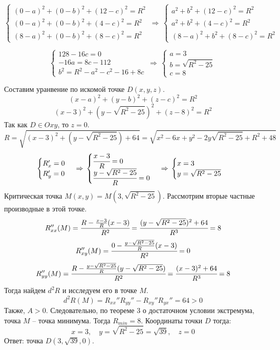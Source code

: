 \documentclass[12pt]{report}
\begin{document}
$$ \begin{cases} (0-a)^2+(0-b)^2+(12-c)^2=R^2 \\
                (0-a)^2+(0-b)^2+(4-c)^2=R^2 \\
                (8-a)^2+(0-b)^2+(8-c)^2=R^2
    \end{cases} \,\Rightarrow\,
    \begin{cases} a^2+b^2+(12-c)^2=R^2 \\
                    a^2+b^2+(4-c)^2=R^2 \\
                    (8-a)^2+b^2+(8-c)^2=R^2
    \end{cases}$$

$$ \begin{cases} 128-16c=0 \\
                -16a=8c-112 \\
                b^2=R^2-a^2-c^2-16+8c
    \end{cases} \,\Rightarrow\,
    \begin{cases} a=3 \\
                b=\sqrt{R^2-25} \\
                c=8
    \end{cases}$$
    
Составим уранвение по искомой точке $D(x,y,z)$.
$$ (x-a)^2+(y-b)^2+(z-c)^2=R^2 $$
$$ (x-3)^2+(y-\sqrt{R^2-25})^2+(z-8)^2=R^2 $$
Так как $D\in Oxy$, то $z=0$.
$$ R=\sqrt{(x-3)^2+(y-\sqrt{R^2-25})+64}=\sqrt{x^2-6x+y^2-2y\sqrt{R^2-25}+R^2+48} $$
$$ \begin{cases} R_x'=0 \\
                R_y'=0
    \end{cases} \,\Rightarrow\,
    \begin{cases} \cfrac{x-3}{R}=0 \\
                \cfrac{y-\sqrt{R^2-25}}{R}=0
    \end{cases} \,\Rightarrow\,
    \begin{cases} x=3 \\
                y=\sqrt{R^2-25}
    \end{cases}$$
Критическая точка $M(x,y)=M(3,\sqrt{R^2-25})$. Рассмотрим вторые частные производные в этой точке.
$$ R_{xx}''(M)=\cfrac{R-\frac{x-3}{R}(x-3)}{R^2}=\cfrac{(y-\sqrt{R^2-25})^2+64}{R^3}=8 $$
$$ R_{xy}''(M)=\cfrac{0-\frac{y-\sqrt{R^2-25}}{R}(x-3)}{R^2}=0 $$
$$ R_{yy}''(M)=\cfrac{R-\frac{y-\sqrt{R^2-25}}{R}(y-\sqrt{R^2-25})}{R^2}=\cfrac{(x-3)^2+64}{R^3}=8 $$
Тогда найдем $d^2R$  и исследуем его в точке $M$.
$$ d^2R(M)=R_{xx}''R_{yy}''-R_{xy}''R_{yx}''=64>0 $$
\newpage
Также, $A>0$. Следовательно, по теореме 3 о достаточном условии экстремума, точка $M$ -- точка минимума. Тогда $R_{min}=8$.
Координаты точки $D$ тогда:
$$ x=3,\quad y=\sqrt{R^2-25}=\sqrt{39},\quad z=0 $$
Ответ: точка $D(3,\sqrt{39},0)$.
\end{document}

